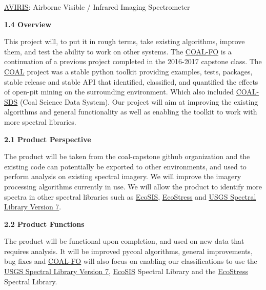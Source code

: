 \documentclass[a4paper,12pt]{article}
\begin{document}
\noindent \href{https://aviris.jpl.nasa.gov/}{AVIRIS}: Airborne Visible / Infrared Imaging Spectrometer\newline


\noindent \textbf{1.4 Overview}\newline


\noindent This project will, to put it in rough terms, take existing algorithms, improve them, and test the ability to work on other systems. The \href{http://eecs.oregonstate.edu/capstone/submission/?page=preview\&pid=320}{COAL-FO} is a continuation of a previous project completed in the 2016-2017 capstone class. The \href{https://capstone-coal.github.io/}{COAL} project was a stable python toolkit providing examples, tests, packages, stable release and stable API that identified, classified, and quantified the effects of open-pit mining on the surrounding environment. Which also included \href{https://github.com/capstone-coal/coal-sds}{COAL-SDS} (Coal Science Data System). Our project will aim at improving the existing algorithms and general functionality as well as enabling the toolkit to work with more spectral libraries. \newline


\newline


\noindent \textbf{2.1 Product Perspective}\newline


\noindent The product will be taken from the coal-capstone github organization and the existing code can potentially be exported to other environments, and used to perform analysis on existing spectral imagery. We will improve the imagery processing algorithms currently in use. We will allow the product to identify more spectra in other spectral libraries such as \href{https://ecosis.org/}{EcoSIS}, \href{https://speclib.jpl.nasa.gov/}{EcoStress} and \href{https://speclab.cr.usgs.gov/spectral-lib.html}{USGS Spectral Library Version 7}.\newline


\noindent \textbf{2.2 Product Functions}\newline


\noindent The product will be functional upon completion, and used on new data that requires analysis. It will be improved pycoal algorithms, general improvements, bug fixes and  \href{http://eecs.oregonstate.edu/capstone/submission/?page=preview\&pid=320}{COAL-FO} will also focus on enabling our classifications to use the \href{https://speclab.cr.usgs.gov/spectral-lib.html}{USGS Spectral Library Version 7}, \href{https://ecosis.org/}{EcoSIS} Spectral Library and the \href{https://speclib.jpl.nasa.gov/}{EcoStress} Spectral Library.  \newline
\end{document}
